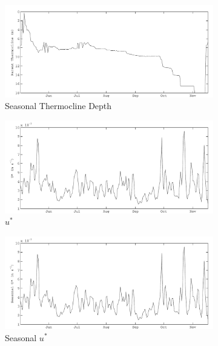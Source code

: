 \begin{figure}
    \begin{subfigure}{\lafigsize}
      \caption{\label{fig:la:out:SthermD}Seasonal Thermocline Depth}
      \includegraphics[width = \linewidth]{figures/Sparkling_SthermD.pdf}
    \end{subfigure}
    \begin{subfigure}{\lafigsize}
      \caption{\label{fig:la:out:uSt}$u^{*}$}
      \includegraphics[width = \linewidth]{figures/Sparkling_uSt.pdf}
    \end{subfigure}
    \begin{subfigure}{\lafigsize}
      \caption{\label{fig:la:out:SuSt}Seasonal $u^{*}$}
      \includegraphics[width = \linewidth]{figures/Sparkling_SuSt.pdf}
    \end{subfigure}
    \begin{subfigure}{\lafigsize}

\end{subfigure}
\end{figure}
